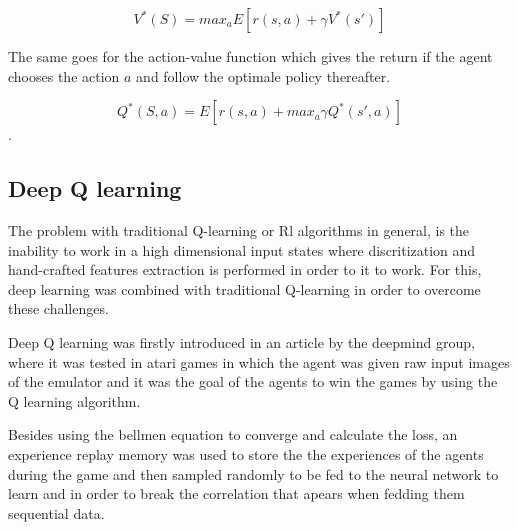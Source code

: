 \documentclass[12pt]{extarticle}
\begin{document}
  
\[ V^{*}(S)=max_{a}E[r(s,a)+\gamma V^{*}(s') ] \] 

The same goes for the action-value function which gives the return if the agent chooses the action $a$ and follow the optimale policy thereafter.

\[ Q^{*}(S,a)=E[r(s,a)+max_{a}\gamma Q^{*}(s',a) ] \]\cite{watkins1992q}.


\pagebreak

\subsection{Deep Q learning}
The problem with traditional Q-learning or Rl algorithms in general, is the inability to work in  a high dimensional input states where discritization and hand-crafted features extraction    is performed in order to it to work. For this, deep learning was combined with traditional Q-learning in order to overcome these challenges.\cite{mnih2013playing}

Deep Q learning was firstly introduced in an article by the deepmind group, where it was tested in atari games in which the agent was given raw input images of the emulator and it was the  goal of the agents to win the games by using the Q learning algorithm.

Besides using the bellmen equation to converge and calculate the loss, an experience replay memory was used to store the the experiences of the agents during  the game and then sampled randomly to be  fed to the neural network to learn and in order to break the correlation that apears when fedding them sequential data.\cite{mnih2013playing}
 
\end{document}
